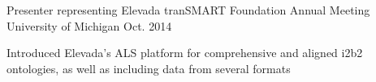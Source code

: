 \begin{cventries}
  \cventry
    {Presenter representing Elevada}
    {tranSMART Foundation Annual Meeting}
    {University of Michigan}
    {Oct. 2014}
    {
      \begin{cvitems}
        \item {Introduced Elevada's ALS platform for comprehensive and aligned i2b2 ontologies, as well as including data from several formats}
      \end{cvitems}
    }
\end{cventries}
